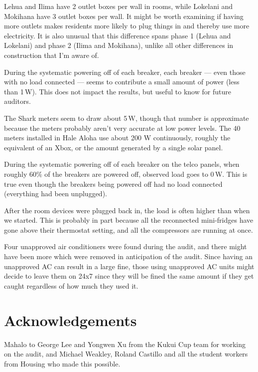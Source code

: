 \documentclass[11pt,draft]{article}
\newcommand{\W}{\,W\xspace}
\begin{document}
Lehua and Ilima have 2 outlet boxes per wall in rooms, while Lokelani and Mokihana have 3 outlet boxes per wall. It might be worth examining if having more outlets makes residents more likely to plug things in and thereby use more electricity. It is also unusual that this difference spans phase 1 (Lehua and Lokelani) and phase 2 (Ilima and Mokihana), unlike all other differences in construction that I'm aware of.

During the systematic powering off of each breaker, each breaker --- even those with no load connected --- seems to contribute a small amount of power (less than 1\W). This does not impact the results, but useful to know for future auditors.

The Shark meters seem to draw about 5\W, though that number is approximate because the meters probably aren't very accurate at low power levels. The 40 meters installed in Hale Aloha use about 200 W continuously, roughly the equivalent of an Xbox, or the amount generated by a single solar panel.

During the systematic powering off of each breaker on the telco panels, when roughly 60\% of the breakers are powered off, observed load goes to 0\W. This is true even though the breakers being powered off had no load connected (everything had been unplugged).

After the room devices were plugged back in, the load is often higher than when we started. This is probably in part because all the reconnected mini-fridges have gone above their thermostat setting, and all the compressors are running at once.

Four unapproved air conditioners were found during the audit, and there might have been more which were removed in anticipation of the audit. Since having an unapproved AC can result in a large fine, those using unapproved AC units might decide to leave them on 24x7 since they will be fined the same amount if they get caught regardless of how much they used it.

\section{Acknowledgements}

Mahalo to George Lee and Yongwen Xu from the Kukui Cup team for working on the audit, and Michael Weakley, Roland Castillo and all the student workers from Housing who made this possible.


%
%
%
%
\end{document}
